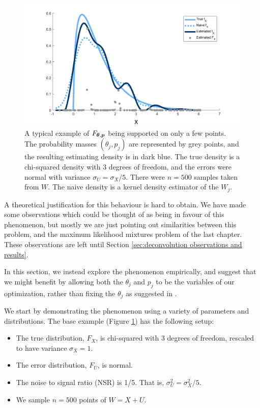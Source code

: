 	\begin{figure}
		\centering
		\includegraphics[width = \textwidth]{Figures/Deconvolution/fixed_masses_example.png}
		\caption[A typical example of $F_{\vect{\theta}, \vect{p}}$ being supported on only a few points]{A typical example of $F_{\vect{\theta}, \vect{p}}$ being supported on only a few points. The probability masses $(\theta_j, p_j)$ are represented by grey points, and the resulting estimating density is in dark blue. The true density is a chi-squared density with 3 degrees of freedom, and the errors were normal with variance $\sigma_U = \sigma_X / 5$. There were $n = 500$ samples taken from $W$. The naive density is a kernel density estimator of the $W_j$.}
		\label{fig:fixed masses example alone}
	\end{figure}

	A theoretical justification for this behaviour is hard to obtain. We have made some observations which could be thought of as being in favour of this phenomenon, but mostly we are just pointing out similarities between this problem, and the maximum likelihood mixtures problem of the last chapter. These observations are left until Section \ref{sec:deconvolution observations and results}.

	In this section, we instead explore the phenomenon empirically, and suggest that we might benefit by allowing both the $\theta_j$ and $p_j$ to be the variables of our optimization, rather than fixing the $\theta_j$ as suggested in \cite{Delaigle2016-la}.

	We start by demonstrating the phenomenon using a variety of parameters and distributions. The base example (Figure \ref{fig:fixed masses example alone}) has the following setup:

	\begin{itemize}
		\item The true distribution, $F_X$, is chi-squared with 3 degrees of freedom, rescaled to have variance $\sigma_X = 1$.
		\item The error distribution, $F_U$, is normal.
		\item The noise to signal ratio (NSR) is 1/5. That is, $\sigma_U^2 = \sigma_X^2 / 5$.
		\item We sample $n = 500$ points of $W = X+U$.
	\end{itemize}

